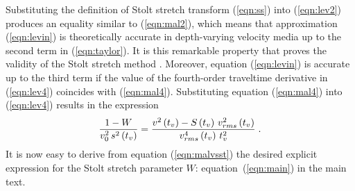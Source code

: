 Substituting the definition of Stolt stretch transform (\ref{eqn:ss})
into (\ref{eqn:lev2}) produces an equality similar to
(\ref{eqn:mal2}), which means that approximation (\ref{eqn:levin}) is
theoretically accurate in depth-varying velocity media up to the
second term in (\ref{eqn:taylor}). It is this remarkable property that
proves the validity of the Stolt stretch method
\cite{levin35,Claerbout.blackwell.85}. Moreover, equation
(\ref{eqn:levin}) is accurate up to the third term if the value of the
fourth-order traveltime derivative in (\ref{eqn:lev4}) coincides with
(\ref{eqn:mal4}). Substituting equation (\ref{eqn:mal4}) into
(\ref{eqn:lev4}) results in the expression
\begin{equation}
{{1-W}\over {v_0^2\,s^2\left(t_v\right)}}=
{{v^2\left(t_v\right)-S\left(t_v\right)\,v_{rms}^2\left(t_v\right)} \over
{v_{rms}^4\left(t_v\right)\,t_v^2}}\;.
\label{eqn:malvsst} 
\end{equation} 
It is now easy to derive from equation (\ref{eqn:malvsst}) the desired
explicit expression for the Stolt stretch parameter $W$:
equation~(\ref{eqn:main}) in the main text.

